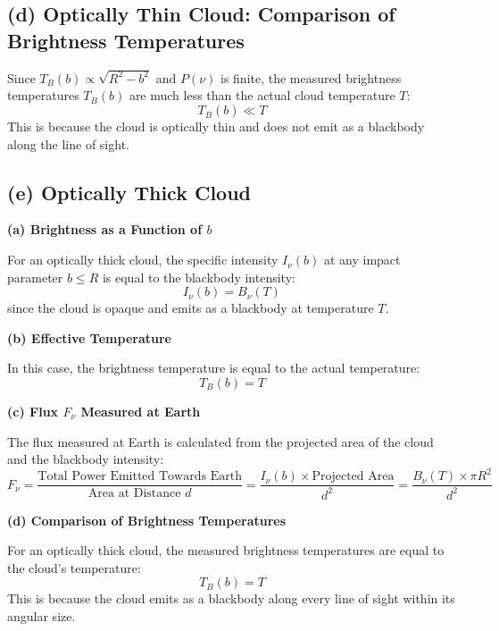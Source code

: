 \documentclass[12pt]{article}
\begin{document}
\subsection*{(d) Optically Thin Cloud: Comparison of Brightness Temperatures}

Since \( T_B(b) \propto \sqrt{R^2 - b^2} \) and \( P(\nu) \) is finite, the measured brightness temperatures \( T_B(b) \) are much less than the actual cloud temperature \( T \):
\[
    T_B(b) \ll T
\]
This is because the cloud is optically thin and does not emit as a blackbody along the line of sight.

\subsection*{(e) Optically Thick Cloud}

\textbf{(a) Brightness as a Function of \( b \)}

For an optically thick cloud, the specific intensity \( I_\nu(b) \) at any impact parameter \( b \leq R \) is equal to the blackbody intensity:
\[
    I_\nu(b) = B_\nu(T)
\]
since the cloud is opaque and emits as a blackbody at temperature \( T \).

\textbf{(b) Effective Temperature}

In this case, the brightness temperature is equal to the actual temperature:
\[
    T_B(b) = T
\]

\textbf{(c) Flux \( F_\nu \) Measured at Earth}

The flux measured at Earth is calculated from the projected area of the cloud and the blackbody intensity:
\[
    F_\nu = \frac{\text{Total Power Emitted Towards Earth}}{\text{Area at Distance } d} = \frac{I_\nu(b) \times \text{Projected Area}}{d^2} = \frac{B_\nu(T) \times \pi R^2}{d^2}
\]

\textbf{(d) Comparison of Brightness Temperatures}

For an optically thick cloud, the measured brightness temperatures are equal to the cloud's temperature:
\[
    T_B(b) = T
\]
This is because the cloud emits as a blackbody along every line of sight within its angular size.

\newpage



\nocite{El-Deeb_PEU-438_Assignments}
\end{document}
